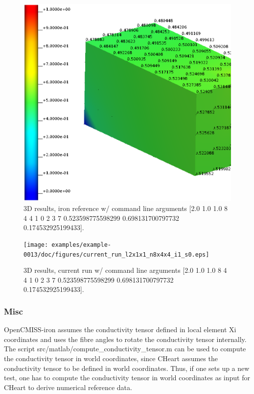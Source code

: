 \begin{figure}[h!]
    \centering 
    \includegraphics[width=0.9\columnwidth]{examples/example-0013/doc/figures/iron_reference_3D.eps} 
    \caption{3D results, iron reference w/ command line arguments [2.0 1.0 1.0 8 4 4 1 0 2 3 7 0.523598775598299 0.698131700797732 0.174532925199433].}
    \label{example-0013-iron-3D-reference-fig}
\end{figure}
%
\begin{figure}[h!]
    \centering 
    \texttt{[image: examples/example-0013/doc/figures/current\_run\_l2x1x1\_n8x4x4\_i1\_s0.eps]} 
    \caption{3D results, current run w/ command line arguments [2.0 1.0 1.0 8 4 4 1 0 2 3 7 0.523598775598299 0.698131700797732 0.174532925199433].}
    \label{example-0013-current-run-3D-fig}
\end{figure}
%
%
\subsubsection{Misc}
%
OpenCMISS-iron assumes the conductivity tensor defined in local element
Xi coordinates and uses the fibre angles to rotate the conductivity tensor
internally.
The script src/matlab/compute\_conductivity\_tensor.m can be used to compute the
conductivity tensor in world coordinates, since CHeart assumes the conductivity
tensor to be defined in world coordinates.
Thus, if one sets up a new test, one has to compute the conductivity tensor
in world coordinates as input for CHeart to derive numerical reference data.
%
